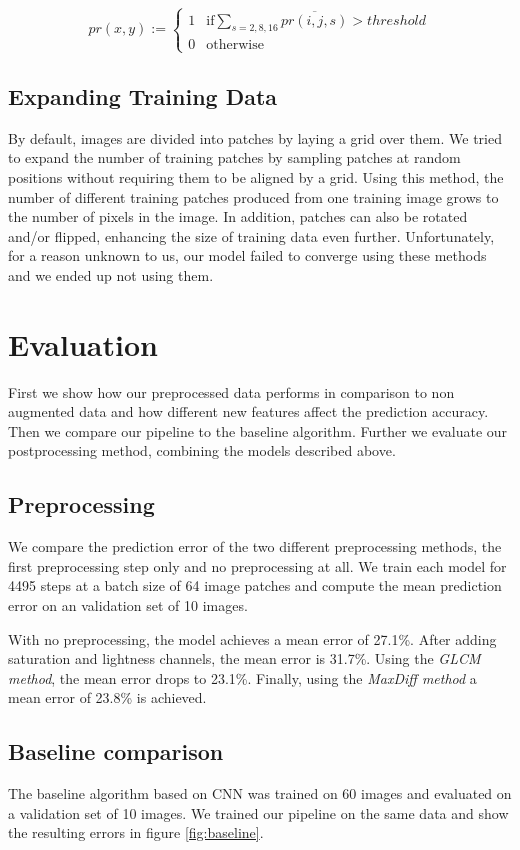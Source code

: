 \documentclass[10pt,conference,compsocconf]{IEEEtran}
\begin{document}
\[
pr(x,y) :=
\begin{cases}
	1 & \text{if} \sum_{s={2,8,16}} \overline{pr(i,j,s)} > threshold\\
	0 & \text{otherwise}
\end{cases}
\]

\subsection{Expanding Training Data}

By default, images are divided into patches by laying a grid over them.
We tried to expand the number of training patches by sampling patches at random positions without requiring them to be aligned by a grid.
Using this method, the number of different training patches produced from one training image grows to the number of pixels in the image.
In addition, patches can also be rotated and/or flipped, enhancing the size of training data even further.
Unfortunately, for a reason unknown to us, our model failed to converge using these methods and we ended up not using them.

\section{Evaluation}
First we show how our preprocessed data performs in comparison to non augmented data and how different new features affect the prediction accuracy. Then we compare our pipeline to the baseline algorithm. Further we evaluate our postprocessing method, combining the models described above. 

\subsection{Preprocessing}

We compare the prediction error of the two different preprocessing methods, the first preprocessing step only and no preprocessing at all.
We train each model for 4495 steps at a batch size of 64 image patches and compute the mean prediction error on an validation set of 10 images.

With no preprocessing, the model achieves a mean error of 27.1\%.
After adding saturation and lightness channels, the mean error is 31.7\%.
Using the \emph{GLCM method}, the mean error drops to 23.1\%.
Finally, using the \emph{MaxDiff method} a mean error of 23.8\% is achieved.

\subsection{Baseline comparison}
The baseline algorithm based on CNN was trained on 60 images and evaluated on a validation set of 10 images. We trained our pipeline on the same data and show the resulting errors in figure \ref{fig:baseline}. 
\end{document}
